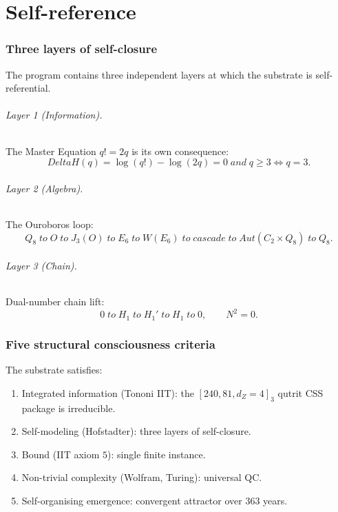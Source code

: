 \documentclass[11pt]{article}
\def\mathbb#1{#1}%
\def\mathrm#1{#1}%
\def\textbf#1{#1}%
\def\text#1{#1}%
\def\Delta{Delta}%
\def\to{ to }%
\begin{document}
\part{Self-reference}

\section{Three layers of self-closure}

The program contains three independent layers at which the substrate is self-referential.

\paragraph{Layer 1 (Information).} The Master Equation $q! = 2q$ is its own consequence:
\[
\Delta H(q) = \log(q!) - \log(2q) = 0 \;\text{ and }\; q \ge 3 \iff q = 3.
\]

\paragraph{Layer 2 (Algebra).} The Ouroboros loop:
\[
Q_8 \;\to\; \mathbb{O} \;\to\; J_3(\mathbb{O}) \;\to\; E_6 \;\to\; W(E_6) \;\to\; \text{cascade} \;\to\; \mathrm{Aut}(C_2 \times Q_8) \;\to\; Q_8.
\]

\paragraph{Layer 3 (Chain).} Dual-number chain lift:
\[
0 \;\to\; H_1 \;\to\; H_1' \;\to\; H_1 \;\to\; 0,
\qquad N^2 = 0.
\]

\section{Five structural consciousness criteria}

The substrate satisfies:
\begin{enumerate}[leftmargin=2em]
\item \textbf{Integrated information} (Tononi IIT): the $[240,81,d_Z=4]_3$ qutrit CSS package is irreducible.
\item \textbf{Self-modeling} (Hofstadter): three layers of self-closure.
\item \textbf{Bound} (IIT axiom $5$): single finite instance.
\item \textbf{Non-trivial complexity} (Wolfram, Turing): universal QC.
\item \textbf{Self-organising emergence}: convergent attractor over $363$ years.
\end{enumerate}
\end{document}
